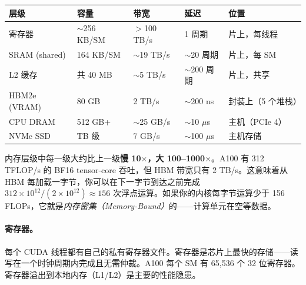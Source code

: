 \begin{keybox}
\small
\begin{center}
\begin{tabularx}{0.82\linewidth}{@{}l l l l Z{1}@{}}
\toprule
\textbf{层级} & \textbf{容量} & \textbf{带宽} & \textbf{延迟} & \textbf{位置} \\
\midrule
寄存器 & $\sim$256 KB/SM & $>$100 TB/s & 1 周期 & 片上，每线程 \\
SRAM (shared) & 164 KB/SM & $\sim$19 TB/s & $\sim$20 周期 & 片上，每 SM \\
L2 缓存 & 共 40 MB & $\sim$5 TB/s & $\sim$200 周期 & 片上，共享 \\
HBM2e (VRAM) & 80 GB & 2 TB/s & $\sim$200 ns & 封装上（5 个堆栈） \\
CPU DRAM & 512 GB+ & $\sim$25 GB/s & $\sim$10 $\mu$s & 主机（PCIe 4） \\
NVMe SSD & TB 级 & 7 GB/s & $\sim$100 $\mu$s & 主机存储 \\
\bottomrule
\end{tabularx}
\end{center}
\end{keybox}

\begin{intuitionbox}[为何各层级差距如此巨大]
内存层级中每一级大约比上一级\textbf{慢 10$\times$，大 100--1000$\times$}。A100 有 312 TFLOP/s 的 BF16 tensor-core 吞吐，但 HBM 带宽只有 2 TB/s。这意味着从 HBM 每加载一字节，你可以在下一字节到达之前完成 $312 \times 10^{12} / (2 \times 10^{12}) \approx 156$ 次浮点运算。如果你的内核每字节运算少于 156 FLOPs，它就是\emph{内存密集（Memory-Bound）}的——计算单元在空等数据。
\end{intuitionbox}

\paragraph{寄存器。}
\label{registers.}

每个 CUDA 线程都有自己的私有寄存器文件。寄存器是芯片上最快的存储——读写在一个时钟周期内完成且无需仲裁。A100 每个 SM 有 65,536 个 32 位寄存器。寄存器溢出到本地内存（L1/L2）是主要的性能隐患。

